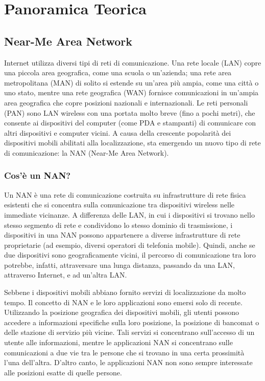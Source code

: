 \chapter{Panoramica Teorica}


\section{Near-Me Area Network}

Internet utilizza diversi tipi di reti di comunicazione. Una rete
locale (LAN) copre una piccola area geografica, come una scuola o
un'azienda; una rete area metropolitana (MAN) di solito si estende su 
un'area più ampia, come una città o uno stato, mentre una rete geografica 
(WAN) fornisce comunicazioni in un'ampia area geografica che copre posizioni
nazionali e internazionali. Le reti personali (PAN) sono LAN wireless con una
portata molto breve (fino a pochi metri), che consente ai dispositivi del 
computer (come PDA e stampanti) di comunicare con altri dispositivi e computer
vicini. A causa della crescente popolarità dei dispositivi mobili abilitati 
alla localizzazione, sta emergendo un nuovo tipo di rete di comunicazione: la 
NAN (Near-Me Area Network).

\subsection{Cos'è un NAN?}
Un NAN è una rete di comunicazione costruita su infrastrutture di rete
fisica esistenti che si concentra sulla comunicazione tra dispositivi wireless
nelle immediate vicinanze. A differenza delle LAN, in cui i dispositivi si
trovano nello stesso segmento di rete e condividono lo stesso dominio di
trasmissione, i dispositivi in ​​una NAN possono appartenere a diverse
infrastrutture di rete proprietarie (ad esempio, diversi operatori di telefonia
mobile). Quindi, anche se due dispositivi sono geograficamente vicini, il
percorso di comunicazione tra loro potrebbe, infatti, attraversare una lunga
distanza, passando da una LAN, attraverso Internet, e ad un'altra LAN.

Sebbene i dispositivi mobili abbiano fornito servizi di localizzazione da
molto tempo. Il concetto di NAN e le loro applicazioni sono emersi solo di
recente. Utilizzando la
posizione geografica dei dispositivi mobili, gli utenti possono accedere a
informazioni specifiche sulla loro posizione, la posizione di bancomat o delle
 stazione di
servizio più vicine. Tali servizi si concentrano sull'accesso di un utente alle
informazioni, mentre le applicazioni NAN si concentrano sulle comunicazioni a
due vie tra le persone che si trovano in una certa prossimità l'una dell'altra.
D'altro canto, le applicazioni NAN non sono sempre interessate alle posizioni
esatte di quelle persone.



